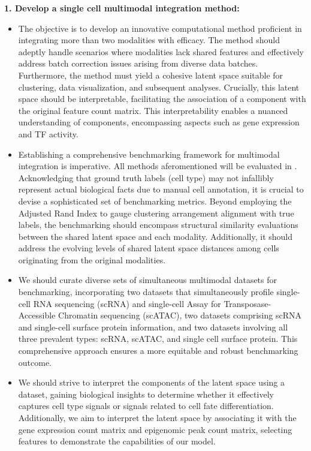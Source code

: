\textbf{1. Develop a single cell multimodal integration method:}
\begin{itemize}
	\item 
	The objective is to develop an innovative computational method proficient in integrating more than two modalities with efficacy. The method should adeptly handle scenarios where modalities lack shared features and effectively address batch correction issues arising from diverse data batches. Furthermore, the method must yield a cohesive latent space suitable for clustering, data visualization, and subsequent analyses. Crucially, this latent space should be interpretable, facilitating the association of a component with the original feature count matrix. This interpretability enables a nuanced understanding of components, encompassing aspects such as gene expression and TF activity.
	\item 
	Establishing a comprehensive benchmarking framework for multimodal integration is imperative. All methods aferomentioned will be evaluated in . Acknowledging that ground truth labels (cell type) may not infallibly represent actual biological facts due to manual cell annotation, it is crucial to devise a sophisticated set of benchmarking metrics. Beyond employing the Adjusted Rand Index to gauge clustering arrangement alignment with true labels, the benchmarking should encompass structural similarity evaluations between the shared latent space and each modality. Additionally, it should address the evolving levels of shared latent space distances among cells originating from the original modalities.
 
	\item 
	We should curate diverse sets of simultaneous multimodal datasets for benchmarking, incorporating two datasets that simultaneously profile single-cell RNA sequencing (scRNA) and single-cell Assay for Transposase-Accessible Chromatin sequencing (scATAC), two datasets comprising scRNA and single-cell surface protein information, and two datasets involving all three prevalent types: scRNA, scATAC, and single cell surface protein. This comprehensive approach ensures a more equitable and robust benchmarking outcome.

	\item 
	We should strive to interpret the components of the latent space using a dataset, gaining biological insights to determine whether it effectively captures cell type signals or signals related to cell fate differentiation. Additionally, we aim to interpret the latent space by associating it with the gene expression count matrix and epigenomic peak count matrix, selecting features to demonstrate the capabilities of our model.
\end{itemize}

